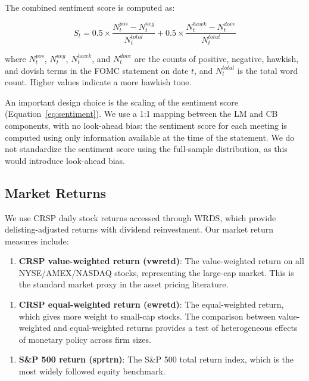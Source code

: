 \documentclass[12pt]{article}
\begin{document}
The combined sentiment score is computed as:

\begin{equation}
\label{eq:sentiment}
S_t = 0.5 \times \frac{N^{pos}_t - N^{neg}_t}{N^{total}_t} + 0.5 \times \frac{N^{hawk}_t - N^{dove}_t}{N^{total}_t}
\end{equation}

where $N^{pos}_t$, $N^{neg}_t$, $N^{hawk}_t$, and $N^{dove}_t$ are the counts of positive, negative, hawkish, and dovish terms in the FOMC statement on date $t$, and $N^{total}_t$ is the total word count. Higher values indicate a more hawkish tone.

An important design choice is the scaling of the sentiment score (Equation~\eqref{eq:sentiment}). We use a 1:1 mapping between the LM and CB components, with no look-ahead bias: the sentiment score for each meeting is computed using only information available at the time of the statement. We do not standardize the sentiment score using the full-sample distribution, as this would introduce look-ahead bias.

\subsection{Market Returns}

We use CRSP daily stock returns accessed through WRDS, which provide delisting-adjusted returns with dividend reinvestment. Our market return measures include:

\begin{enumerate}
\item \textbf{CRSP value-weighted return (vwretd)}: The value-weighted return on all NYSE/AMEX/NASDAQ stocks, representing the large-cap market. This is the standard market proxy in the asset pricing literature.
\end{enumerate}

\begin{enumerate}
\item \textbf{CRSP equal-weighted return (ewretd)}: The equal-weighted return, which gives more weight to small-cap stocks. The comparison between value-weighted and equal-weighted returns provides a test of heterogeneous effects of monetary policy across firm sizes.
\end{enumerate}

\begin{enumerate}
\item \textbf{S\&P 500 return (sprtrn)}: The S\&P 500 total return index, which is the most widely followed equity benchmark.
\end{enumerate}
\end{document}
